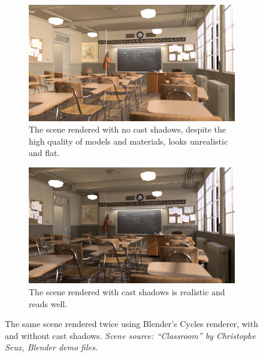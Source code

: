 \begin{figure}
    \centering
    \begin{subfigure}{\textwidth}
        \includegraphics[width=\textwidth]{./graf/classroom_no_shadow.png}
        \caption{The scene rendered with no cast shadows, despite the high quality of models and materials, looks unrealistic and flat.}
        \label{fig:classroom_no_shad}
    \end{subfigure}

    \begin{subfigure}{\textwidth}
        \includegraphics[width=\textwidth]{./graf/classroom_shadow.png}
        \caption{The scene rendered with cast shadows is realistic and reads well.}
        \label{fig:classroom_shad}
    \end{subfigure}

    \caption{The same scene rendered twice using Blender's Cycles renderer, with and without cast shadows. \textit{Scene source: ``Classroom'' by Christophe Seux, Blender demo files.}}
    \label{fig:classroom_example}
\end{figure}


